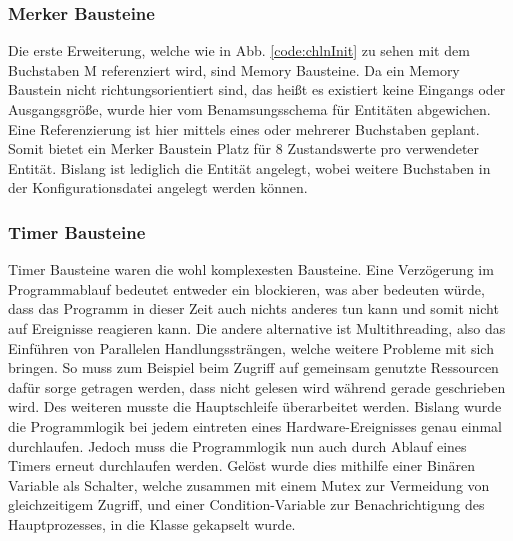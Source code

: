 \subsubsection{Merker Bausteine}\label{kap:ums:memorychannel}
Die erste Erweiterung, welche wie in Abb. \ref{code:chlnInit} zu sehen mit dem Buchstaben M referenziert wird, sind Memory Bausteine. Da ein Memory Baustein nicht richtungsorientiert sind, das heißt es existiert keine Eingangs oder Ausgangsgröße, wurde hier vom Benamsungsschema für Entitäten  abgewichen. Eine Referenzierung ist hier mittels eines oder mehrerer Buchstaben geplant. Somit bietet ein Merker Baustein Platz für 8 Zustandswerte pro verwendeter Entität. Bislang ist lediglich die Entität  angelegt, wobei weitere Buchstaben in der Konfigurationsdatei angelegt werden können.

\subsubsection{Timer Bausteine}\label{kap:ums:timerchannel}
Timer Bausteine waren die wohl komplexesten Bausteine. Eine Verzögerung im Programmablauf bedeutet entweder ein blockieren, was aber bedeuten würde, dass das Programm in dieser Zeit auch nichts anderes tun kann und somit nicht auf Ereignisse reagieren kann. Die andere alternative ist Multithreading, also das Einführen von Parallelen Handlungssträngen, welche weitere Probleme mit sich bringen. So muss zum Beispiel beim Zugriff auf gemeinsam genutzte Ressourcen dafür sorge getragen werden, dass nicht gelesen wird während gerade geschrieben wird. Des weiteren musste die Hauptschleife überarbeitet werden. Bislang wurde die Programmlogik bei jedem eintreten eines Hardware-Ereignisses genau einmal durchlaufen. Jedoch muss die Programmlogik nun auch durch Ablauf eines Timers erneut durchlaufen werden. Gelöst wurde dies mithilfe einer Binären Variable als Schalter, welche zusammen mit einem Mutex zur Vermeidung von gleichzeitigem Zugriff, und einer Condition-Variable zur Benachrichtigung des Hauptprozesses, in die Klasse  gekapselt wurde. 
